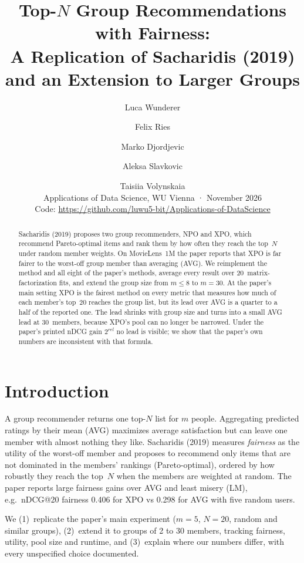 \documentclass[11pt,a4paper]{article}
\title{\vspace{-1.6cm}Top-$N$ Group Recommendations with Fairness:\\
\large A Replication of Sacharidis (2019) and an Extension to Larger Groups}
\author{Luca Wunderer \and Felix Ries \and Marko Djordjevic \and Aleksa Slavkovic \and Taisiia Volynskaia\\[0.3em]
\small Applications of Data Science, WU Vienna \quad·\quad 22 November 2026\\
\small Code: \url{https://github.com/luwu5-bit/Applications-of-DataScience}}
\date{}
\newcommand{\npo}{NPO}
\newcommand{\xpo}{XPO}
\begin{document}
\maketitle
\vspace{-1.2cm}

\begin{abstract}
\noindent
Sacharidis (2019) proposes two group recommenders, \npo{} and \xpo{}, which
recommend Pareto-optimal items and rank them by how often they reach the top~$N$
under random member weights. On MovieLens~1M the paper reports that \xpo{} is
far fairer to the worst-off group member than averaging (AVG). We reimplement
the method and all eight of the paper's methods, average every result over
20~matrix-factorization fits, and extend the group size from $m\le 8$ to $m=30$.
At the paper's main setting \xpo{} is the fairest method on every metric that
measures how much of each member's top~20 reaches the group list, but its lead
over AVG is a quarter to a half of the reported one. The lead shrinks with group
size and turns into a small AVG lead at 30~members, because \xpo{}'s pool can no
longer be narrowed. Under the paper's printed nDCG gain $2^{rel}$ no lead is
visible; we show that the paper's own numbers are inconsistent with that formula.
\end{abstract}

\section{Introduction}

A group recommender returns one top-$N$ list for $m$ people. Aggregating
predicted ratings by their mean (AVG) maximizes average satisfaction but can
leave one member with almost nothing they like. Sacharidis (2019) measures
\emph{fairness} as the utility of the worst-off member and proposes to
recommend only items that are not dominated in the members' rankings
(Pareto-optimal), ordered by how robustly they reach the top~$N$ when the
members are weighted at random. The paper reports large fairness gains over
AVG and least misery (LM), e.g.\ nDCG@20 fairness 0.406 for \xpo{} vs 0.298 for
AVG with five random users.

We (1)~replicate the paper's main experiment ($m=5$, $N=20$, random and
similar groups), (2)~extend it to groups of 2 to 30 members, tracking
fairness, utility, pool size and runtime, and (3)~explain where our numbers
differ, with every unspecified choice documented.
\end{document}
